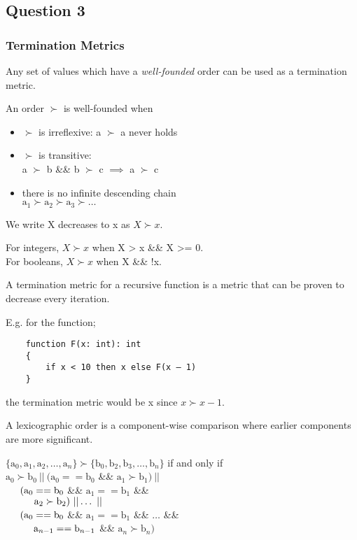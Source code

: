 \subsection{Question 3}
\subsubsection{Termination Metrics}
Any set of values which have a \textit{well-founded} order can be used as a termination metric.

An order $\succ$ is well-founded when
\begin{itemize}
    \item $\succ$ is irreflexive: a $\succ$ a never holds
    \item $\succ$ is transitive:\\
        \tab a $\succ$ b \&\& b $\succ$ c $\implies$ a $\succ$ c
    \item there is no infinite descending chain\\
        \tab $\text{a}_1 \succ \text{a}_2  \succ \text{a}_3  \succ \dots$
\end{itemize}

We write X decreases to x as $X \succ x$.

For integers, $X \succ x$ when X > x \&\& X >= 0. \\
For booleans, $X \succ x$ when X \&\& !x.

A termination metric for a recursive function is a metric that can be proven to decrease every iteration.

E.g. for the function;
\begin{verbatim}
    function F(x: int): int 
    { 
        if x < 10 then x else F(x – 1)
    }
\end{verbatim}
the termination metric would be x since $x \succ x - 1$.

A lexicographic order is a component-wise comparison where earlier components are more significant.

$\{\text{a}_0, \text{a}_1, \text{a}_2, \dots, \text{a}_n\} \succ \{\text{b}_0, \text{b}_2, \text{b}_3, \dots, \text{b}_n\}$ if and only if\\
$\text{a}_0 \succ \text{b}_0\ ||\ (\text{a}_0 == \text{b}_0$ \&\& $\text{a}_1 \succ \text{b}_1)\ ||$\\
$\hspace*{0.5cm} (\text{a}_0 == \text{b}_0$ \&\& $\text{a}_1 == \text{b}_1$ \&\&\\
$\tab \tab \text{a}_2 \succ \text{b}_2)\ || \dots\ ||$\\
$\hspace*{0.5cm} (\text{a}_0 == \text{b}_0$ \&\& $\text{a}_1 == \text{b}_1$ \&\& $\dots$ \&\&\\
$\tab \tab \text{a}_{n-1} == \text{b}_{n-1}$ \&\& $\text{a}_n \succ \text{b}_n)$

